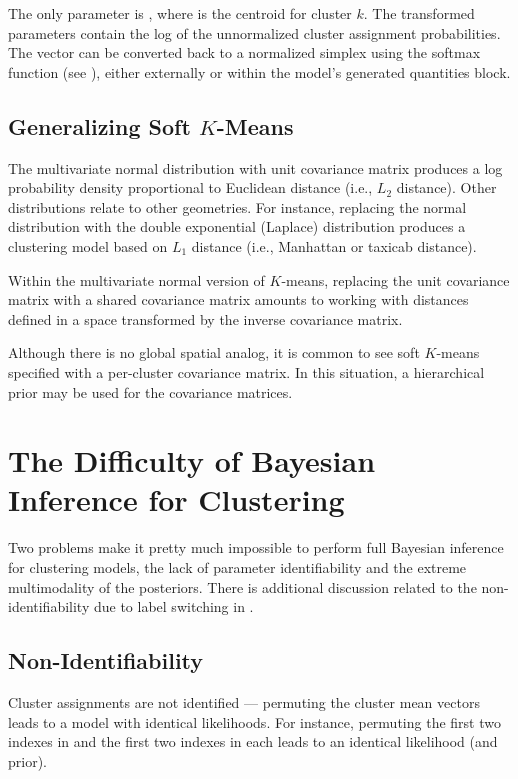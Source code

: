 The only parameter is , where  is the centroid
for cluster $k$.  The transformed parameters  contain
the log of the unnormalized cluster assignment probabilities.  The
vector  can be converted back to a normalized simplex
using the softmax function (see ), either
externally or within the model's generated quantities block.

\subsection{Generalizing Soft $K$-Means}

The multivariate normal distribution with unit covariance matrix
produces a log probability density proportional to Euclidean distance
(i.e., $L_2$ distance).  Other distributions relate to other
geometries.  For instance, replacing the normal distribution with the
double exponential (Laplace) distribution produces a clustering model
based on $L_1$ distance (i.e., Manhattan or taxicab
distance).

Within the multivariate normal version of $K$-means, replacing the
unit covariance matrix with a shared covariance matrix amounts to
working with distances defined in a space transformed by the inverse
covariance matrix.

Although there is no global spatial analog, it is common to see soft
$K$-means specified with a per-cluster covariance matrix. In this
situation, a hierarchical prior may be used for the covariance matrices.



\section{The Difficulty of Bayesian Inference for Clustering}

Two problems make it pretty much impossible to perform full Bayesian
inference for clustering models, the lack of parameter identifiability
and the extreme multimodality of the posteriors.  There is additional
discussion related to the non-identifiability due to label switching
in .

\subsection{Non-Identifiability}

Cluster assignments are not identified --- permuting the cluster mean
vectors  leads to a model with identical likelihoods.  For
instance, permuting the first two indexes in  and the first
two indexes in each  leads to an identical likelihood
(and prior).

